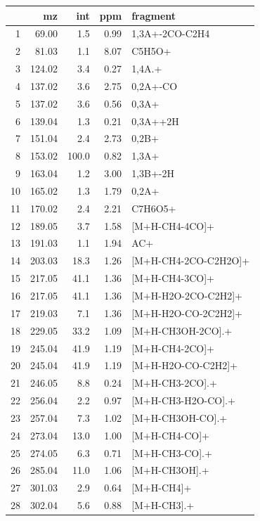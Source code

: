 \documentclass[]{article}
\begin{document}
\begin{table}[ht]
\centering
\begin{tabular}{rrrrl}
  \toprule
 & mz & int & ppm & fragment \\ 
  \midrule
1 & 69.00 & 1.5 & 0.99 & 1,3A+-2CO-C2H4 \\ 
  2 & 81.03 & 1.1 & 8.07 & C5H5O+ \\ 
  3 & 124.02 & 3.4 & 0.27 & 1,4A.+ \\ 
  4 & 137.02 & 3.6 & 2.75 & 0,2A+-CO \\ 
  5 & 137.02 & 3.6 & 0.56 & 0,3A+ \\ 
  6 & 139.04 & 1.3 & 0.21 & 0,3A++2H \\ 
  7 & 151.04 & 2.4 & 2.73 & 0,2B+ \\ 
  8 & 153.02 & 100.0 & 0.82 & 1,3A+ \\ 
  9 & 163.04 & 1.2 & 3.00 & 1,3B+-2H \\ 
  10 & 165.02 & 1.3 & 1.79 & 0,2A+ \\ 
  11 & 170.02 & 2.4 & 2.21 & C7H6O5+ \\ 
  12 & 189.05 & 3.7 & 1.58 & [M+H-CH4-4CO]+ \\ 
  13 & 191.03 & 1.1 & 1.94 & AC+ \\ 
  14 & 203.03 & 18.3 & 1.26 & [M+H-CH4-2CO-C2H2O]+ \\ 
  15 & 217.05 & 41.1 & 1.36 & [M+H-CH4-3CO]+ \\ 
  16 & 217.05 & 41.1 & 1.36 & [M+H-H2O-2CO-C2H2]+ \\ 
  17 & 219.03 & 7.1 & 1.36 & [M+H-H2O-CO-2C2H2]+ \\ 
  18 & 229.05 & 33.2 & 1.09 & [M+H-CH3OH-2CO].+ \\ 
  19 & 245.04 & 41.9 & 1.19 & [M+H-CH4-2CO]+ \\ 
  20 & 245.04 & 41.9 & 1.19 & [M+H-H2O-CO-C2H2]+ \\ 
  21 & 246.05 & 8.8 & 0.24 & [M+H-CH3-2CO].+ \\ 
  22 & 256.04 & 2.2 & 0.97 & [M+H-CH3-H2O-CO].+ \\ 
  23 & 257.04 & 7.3 & 1.02 & [M+H-CH3OH-CO].+ \\ 
  24 & 273.04 & 13.0 & 1.00 & [M+H-CH4-CO]+ \\ 
  25 & 274.05 & 6.3 & 0.71 & [M+H-CH3-CO].+ \\ 
  26 & 285.04 & 11.0 & 1.06 & [M+H-CH3OH].+ \\ 
  27 & 301.03 & 2.9 & 0.64 & [M+H-CH4]+ \\ 
  28 & 302.04 & 5.6 & 0.88 & [M+H-CH3].+ \\ 
   \bottomrule
\end{tabular}
\end{table}
\end{document}
